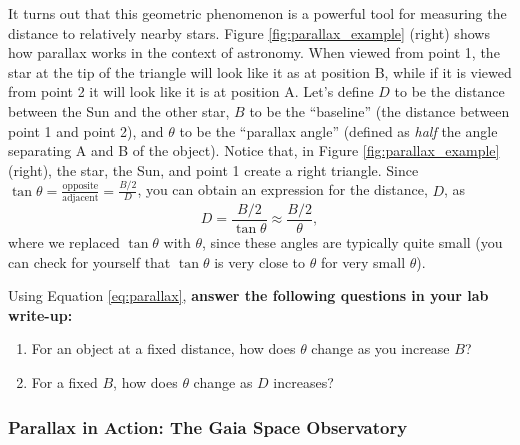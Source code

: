\documentclass[11pt]{article}
\begin{document}
\medskip \noindent
It turns out that this geometric phenomenon is a powerful tool for measuring the distance to relatively nearby stars. Figure \ref{fig:parallax_example} (right) shows how parallax works in the context of astronomy. When viewed from point 1, the star at the tip of the triangle will look like it as at position B, while if it is viewed from point 2 it will look like it is at position A. Let's define $D$ to be the distance between the Sun and the other star, $B$ to be the ``baseline'' (the distance between point 1 and point 2), and $\theta$ to be the ``parallax angle'' (defined as \textsl{half} the angle separating A and B of the object). Notice that, in Figure \ref{fig:parallax_example} (right), the star, the Sun, and point 1 create a right triangle. Since $\tan\theta = \frac{\mathrm{opposite}}{\mathrm{adjacent}} = \frac{B/2}{D}$, you can obtain an expression for the distance, $D$, as 
\begin{equation} \label{eq:parallax}
    D = \frac{B/2}{\tan\theta} \approx \boxed{\frac{B/2}{\theta}},
\end{equation}
where we replaced $\tan\theta$ with $\theta$, since these angles are typically quite small (you can check for yourself that $\tan\theta$ is very close to $\theta$ for very small $\theta$).

\medskip \noindent
Using Equation \ref{eq:parallax}, \textbf{answer the following questions in your lab write-up:}

\begin{enumerate}[resume]
    \item For an object at a fixed distance, how does $\theta$ change as you increase $B$? 
    
    \item For a fixed $B$, how does $\theta$ change as $D$ increases?
\end{enumerate}




\subsubsection{Parallax in Action: The Gaia Space Observatory}
\end{document}
